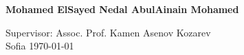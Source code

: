 \begin{titlepage}
\begin{center}
        \vspace{1.5cm}
        
        \LARGE
        \textbf{Mohamed ElSayed Nedal AbulAinain Mohamed}
        
        \vfill
        
        
        \vspace{0.5cm}
        
        \Large
        Supervisor: Assoc. Prof. Kamen Asenov Kozarev\\
        Sofia
        \today
        
        \vspace{0.8cm}
        
        
        
    \end{center}
\end{titlepage}
